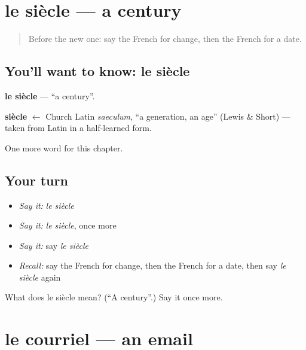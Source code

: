\section[le siècle]{le siècle — a century}

\label{lesson:FR-C135-siecle}



\begin{quote}
Before the new one: say the French for change, then the French for a date.
\end{quote}

\subsection*{You'll want to know: le siècle}
\textbf{le siècle} — \textquotedblleft{}a century\textquotedblright{}.

\begin{cousinweb}
\textbf{siècle} $\leftarrow$ Church Latin \emph{saeculum}, \textquotedblleft{}a generation, an age\textquotedblright{} (Lewis \& Short) — taken from Latin in a half-learned form.
\end{cousinweb}

\begin{grammarlens}[title={What you've built}]
One more word for this chapter.
\end{grammarlens}

\subsection*{Your turn}
\begin{itemize}
\raggedright
  \item \emph{Say it:} \emph{le siècle}
  \item \emph{Say it:} \emph{le siècle}, once more
  \item \emph{Say it:} say \emph{le siècle}
  \item \emph{Recall:} say the French for change, then the French for a date, then say \emph{le siècle} again
\end{itemize}

\begin{tcolorbox}[breakable,colback=teal!4,colframe=teal!35!black,title={Before you move on}]
What does le siècle mean? (\textquotedblleft{}A century\textquotedblright{}.) Say it once more.
\end{tcolorbox}
\section[le courriel]{le courriel — an email}

